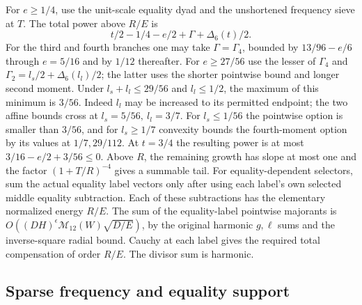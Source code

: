For \(e\ge1/4\), use the unit-scale equality dyad and the
unshortened frequency sieve at \(T\). The total power above
\(R/E\) is
\[
 t/2-1/4-e/2+\Gamma+\Delta_6(t)/2 .
\]
For the third and fourth branches one may take
\(\Gamma=\Gamma_4\), bounded by \(13/96-e/6\)
through \(e=5/16\) and by \(1/12\) thereafter.
For \(e\ge27/56\) use the lesser of \(\Gamma_4\) and
\(\Gamma_2=l_s/2+\Delta_6(l_l)/2\); the latter
uses the shorter pointwise bound and longer second moment.
Under \(l_s+l_l\le29/56\) and \(l_l\le1/2\),
the maximum of this minimum is \(3/56\).
Indeed \(l_l\) may be increased to its permitted endpoint;
the two affine bounds cross at \(l_s=5/56,\ l_l=3/7\).
For \(l_s\le1/56\) the pointwise option is smaller than
\(3/56\), and for \(l_s\ge1/7\) convexity bounds the
fourth-moment option by its values at \(1/7,29/112\).
At \(t=3/4\) the resulting power is at most
\(3/16-e/2+3/56\le0\).
Above \(R\), the remaining growth has slope at most one
and the factor \((1+T/R)^{-4}\) gives a summable tail.
For equality-dependent selectors, sum the actual equality
label vectors only after using each label's own
selected middle equality subtraction. Each of these
subtractions has the elementary normalized energy \(R/E\).
The sum of the equality-label pointwise majorants is
\(O((DH)^\epsilon\mathcal M_{12}(W)\sqrt{D/E})\), by the
original harmonic \(g,\ell\) sums and the inverse-square radial
bound. Cauchy at each label gives the required total
compensation of order \(R/E\). The divisor sum is harmonic.

\subsection{Sparse frequency and equality support}
\label{pca:joint-sparse-proof}

